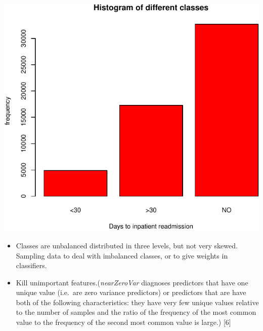 \documentclass[]{article}
\newenvironment{Shaded}{\begin{snugshade}}{\end{snugshade}}
\newcommand{\KeywordTok}[1]{\textcolor[rgb]{0.13,0.29,0.53}{\textbf{{#1}}}}
\newcommand{\DataTypeTok}[1]{\textcolor[rgb]{0.13,0.29,0.53}{{#1}}}
\newcommand{\DecValTok}[1]{\textcolor[rgb]{0.00,0.00,0.81}{{#1}}}
\newcommand{\StringTok}[1]{\textcolor[rgb]{0.31,0.60,0.02}{{#1}}}
\newcommand{\OtherTok}[1]{\textcolor[rgb]{0.56,0.35,0.01}{{#1}}}
\newcommand{\NormalTok}[1]{{#1}}
\begin{document}
\begin{itemize}
  \includegraphics{Project_files/figure-latex/Preprocessing_classtype-1.pdf}

  \begin{itemize}
  \itemsep1pt\parskip0pt
  \item
    Classes are unbalanced distributed in three levels, but not very
    skewed. Sampling data to deal with imbalanced classes, or to give
    weights in classifiers.
  \item
    Kill unimportant features.(\emph{nearZeroVar} diagnoses predictors
    that have one unique value (i.e.~are zero variance predictors) or
    predictors that are have both of the following characteristics: they
    have very few unique values relative to the number of samples and
    the ratio of the frequency of the most common value to the frequency
    of the second most common value is large.) {[}6{]}
  \end{itemize}

\begin{Shaded}
\end{Shaded}


\end{itemize}
\end{document}
